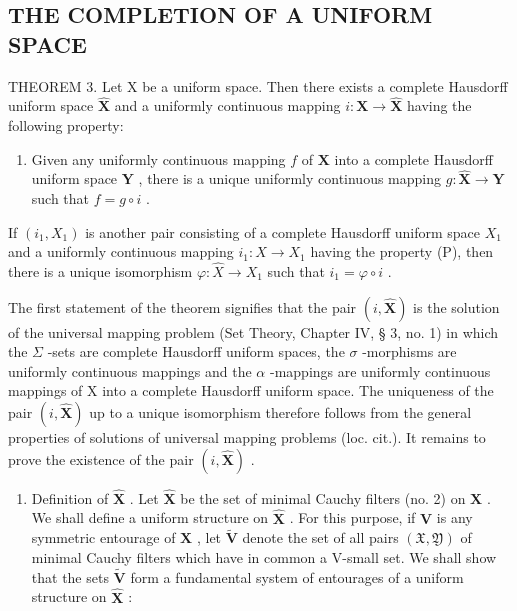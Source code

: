 \subsection{THE COMPLETION OF A UNIFORM SPACE}

THEOREM 3. Let X be a uniform space. Then there exists a complete Hausdorff uniform space \(\hat{\mathbf{X}}\) and a uniformly continuous mapping \(i: \mathbf{X} \to \hat{\mathbf{X}}\) having the following property:

\begin{enumerate}
\def\labelenumi{(\Alph{enumi})}
\setcounter{enumi}{15}
\tightlist
\item
  Given any uniformly continuous mapping \(f\) of \(\mathbf{X}\) into a complete Hausdorff uniform space \(\mathbf{Y}\) , there is a unique uniformly continuous mapping \(g: \hat{\mathbf{X}} \to \mathbf{Y}\) such that \(f = g \circ i\) .
\end{enumerate}

If \((i_1, X_1)\) is another pair consisting of a complete Hausdorff uniform space \(X_1\) and a uniformly continuous mapping \(i_1: X \to X_1\) having the property (P), then there is a unique isomorphism \(\varphi: \hat{X} \to X_1\) such that \(i_1 = \varphi \circ i\) .

The first statement of the theorem signifies that the pair \((i, \hat{\mathbf{X}})\) is the solution of the universal mapping problem (Set Theory, Chapter IV, § 3, no. 1) in which the \(\Sigma\) -sets are complete Hausdorff uniform spaces, the \(\sigma\) -morphisms are uniformly continuous mappings and the \(\alpha\) -mappings are uniformly continuous mappings of X into a complete Hausdorff uniform space. The uniqueness of the pair \((i, \hat{\mathbf{X}})\) up to a unique isomorphism therefore follows from the general properties of solutions of universal mapping problems (loc. cit.). It remains to prove the existence of the pair \((i, \hat{\mathbf{X}})\) .

\begin{enumerate}
\def\labelenumi{\arabic{enumi})}
\tightlist
\item
  Definition of \(\hat{\mathbf{X}}\) . Let \(\hat{\mathbf{X}}\) be the set of minimal Cauchy filters (no. 2) on \(\mathbf{X}\) . We shall define a uniform structure on \(\hat{\mathbf{X}}\) . For this purpose, if \(\mathbf{V}\) is any symmetric entourage of \(\mathbf{X}\) , let \(\tilde{\mathbf{V}}\) denote the set of all pairs \((\mathfrak{X}, \mathfrak{Y})\) of minimal Cauchy filters which have in common a V-small set. We shall show that the sets \(\tilde{\mathbf{V}}\) form a fundamental system of entourages of a uniform structure on \(\hat{\mathbf{X}}\) :
\end{enumerate}

